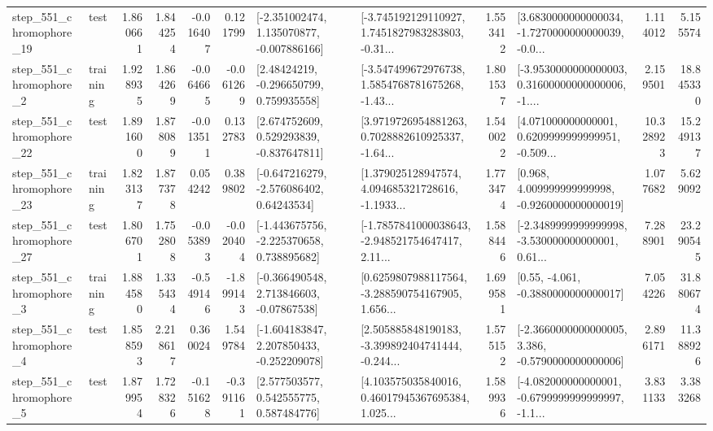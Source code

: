 \begin{tabular}{llrrrrllrlrr}
  step\_551\_chromophore\_19 &      test &      1.860661 &    1.844254 &     -0.016407 &  0.121799 &   [-2.351002474, 1.135070877, -0.007886166] &  [-3.745192129110927, 1.7451827983283803, -0.31... &       1.553412 &  [3.6830000000000034, -1.7270000000000039, -0.0... &            1.114012 &          5.155574 \\
   step\_551\_chromophore\_2 &  training &      1.928935 &    1.864269 &     -0.064665 & -0.061269 &     [2.48424219, -0.296650799, 0.759935558] &  [-3.547499672976738, 1.5854768781675268, -1.43... &       1.801537 &  [-3.9530000000000003, 0.31600000000000006, -1.... &            2.159501 &         18.845330 \\
  step\_551\_chromophore\_22 &      test &      1.891600 &    1.878089 &     -0.013511 &  0.132783 &    [2.674752609, 0.529293839, -0.837647811] &  [3.9719726954881263, 0.7028882610925337, -1.64... &       1.540022 &  [4.071000000000001, 0.6209999999999951, -0.509... &           10.328923 &         15.249137 \\
  step\_551\_chromophore\_23 &  training &      1.823137 &    1.877378 &      0.054242 &  0.389802 &    [-0.647216279, -2.576086402, 0.64243534] &  [1.379025128947574, 4.094685321728616, -1.1933... &       1.773474 &    [0.968, 4.009999999999998, -0.9260000000000019] &            1.077682 &          5.629092 \\
  step\_551\_chromophore\_27 &      test &      1.806701 &    1.752808 &     -0.053893 & -0.020404 &   [-1.443675756, -2.225370658, 0.738895682] &  [-1.7857841000038643, -2.948521754647417, 2.11... &       1.588446 &  [-2.3489999999999998, -3.530000000000001, 0.61... &            7.288901 &         23.290545 \\
   step\_551\_chromophore\_3 &  training &      1.884580 &    1.335434 &     -0.549146 & -1.899143 &    [-0.366490548, 2.713846603, -0.07867538] &  [0.6259807988117564, -3.288590754167905, 1.656... &       1.699581 &                [0.55, -4.061, -0.3880000000000017] &            7.054226 &         31.880674 \\
   step\_551\_chromophore\_4 &      test &      1.858593 &    2.218617 &      0.360024 &  1.549784 &   [-1.604183847, 2.207850433, -0.252209078] &  [2.505885848190183, -3.399892404741444, -0.244... &       1.575152 &  [-2.3660000000000005, 3.386, -0.5790000000000006] &            2.896171 &         11.388926 \\
   step\_551\_chromophore\_5 &      test &      1.879954 &    1.728326 &     -0.151628 & -0.391161 &     [2.577503577, 0.542555775, 0.587484776] &  [4.103575035840016, 0.46017945367695384, 1.025... &       1.589936 &  [-4.082000000000001, -0.6799999999999997, -1.1... &            3.831133 &          3.383268 \\

\end{tabular}
